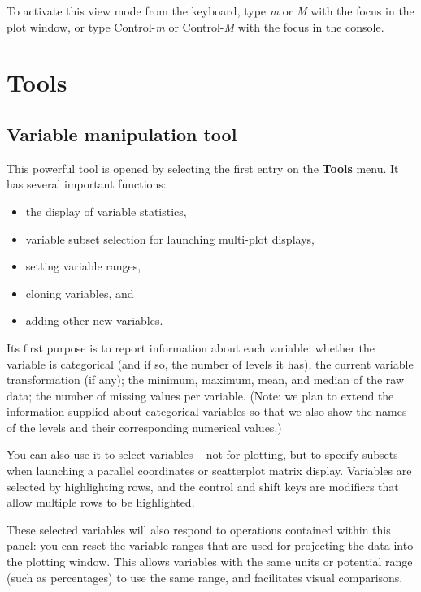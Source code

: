 \documentclass[11pt]{article}
\begin{document}
To activate this view mode from the keyboard, type {\em m} or {\em M}
with the focus in the plot window, or type Control-{\em m} or
Control-{\em M} with the focus in the console.

\newpage
\section{Tools}
\label{Tools}

\subsection{Variable manipulation tool}
\label{slbl:VarManip}

This powerful tool is opened by selecting the first entry on the
{\bf Tools} menu.  It has several important functions:
\begin{itemize}
\itemsep 0em
\item the display of variable statistics,
\item variable subset selection for launching multi-plot displays,
\item setting variable ranges,
\item cloning variables, and
\item adding other new variables.
\end{itemize}

Its first purpose is to report information about each variable:
whether the variable is categorical (and if so, the number of levels
it has), the current variable transformation (if any); the minimum,
maximum, mean, and median of the raw data; the number of missing values
per variable.  (Note: we plan to extend the information supplied about
categorical variables so that we also show the names of the levels
and their corresponding numerical values.)

You can also use it to select variables -- not for plotting, but to
specify subsets when launching a parallel coordinates or scatterplot
matrix display.  Variables are selected by highlighting rows, and the
control and shift keys are modifiers that allow multiple rows to be
highlighted.

These selected variables will also respond to operations contained
within this panel:  you can reset the variable ranges that are used
for projecting the data into the plotting window.  This allows
variables with the same units or potential range (such as percentages)
to use the same range, and facilitates visual comparisons.
\end{document}
